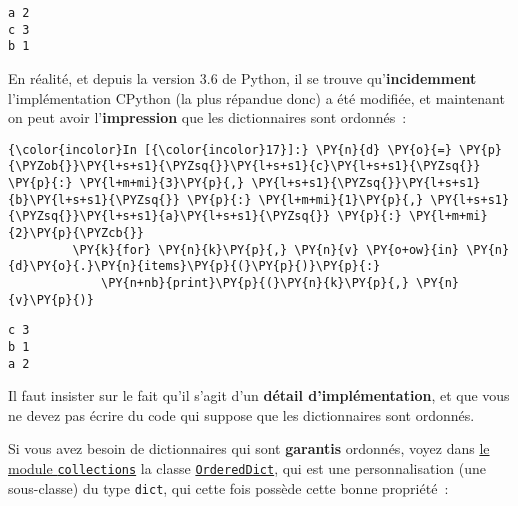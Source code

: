     \begin{Verbatim}[commandchars=\\\{\},frame=single,framerule=0.3mm,rulecolor=\color{cellframecolor}]
a 2
c 3
b 1
\end{Verbatim}

    En réalité, et depuis la version 3.6 de Python, il se trouve
qu'\textbf{incidemment} l'implémentation CPython (la plus répandue donc)
a été modifiée, et maintenant on peut avoir l'\textbf{impression} que
les dictionnaires sont ordonnés~:

    \begin{Verbatim}[commandchars=\\\{\},frame=single,framerule=0.3mm,rulecolor=\color{cellframecolor}]
{\color{incolor}In [{\color{incolor}17}]:} \PY{n}{d} \PY{o}{=} \PY{p}{\PYZob{}}\PY{l+s+s1}{\PYZsq{}}\PY{l+s+s1}{c}\PY{l+s+s1}{\PYZsq{}} \PY{p}{:} \PY{l+m+mi}{3}\PY{p}{,} \PY{l+s+s1}{\PYZsq{}}\PY{l+s+s1}{b}\PY{l+s+s1}{\PYZsq{}} \PY{p}{:} \PY{l+m+mi}{1}\PY{p}{,} \PY{l+s+s1}{\PYZsq{}}\PY{l+s+s1}{a}\PY{l+s+s1}{\PYZsq{}} \PY{p}{:} \PY{l+m+mi}{2}\PY{p}{\PYZcb{}}
         \PY{k}{for} \PY{n}{k}\PY{p}{,} \PY{n}{v} \PY{o+ow}{in} \PY{n}{d}\PY{o}{.}\PY{n}{items}\PY{p}{(}\PY{p}{)}\PY{p}{:}
             \PY{n+nb}{print}\PY{p}{(}\PY{n}{k}\PY{p}{,} \PY{n}{v}\PY{p}{)}
\end{Verbatim}


    \begin{Verbatim}[commandchars=\\\{\},frame=single,framerule=0.3mm,rulecolor=\color{cellframecolor}]
c 3
b 1
a 2
\end{Verbatim}

    Il faut insister sur le fait qu'il s'agit d'un \textbf{détail
d'implémentation}, et que vous ne devez pas écrire du code qui suppose
que les dictionnaires sont ordonnés.

    Si vous avez besoin de dictionnaires qui sont \textbf{garantis}
ordonnés, voyez dans
\href{https://docs.python.org/3/library/collections.html}{le module
\texttt{collections}} la classe
\href{https://docs.python.org/3/library/collections.html\#collections.OrderedDict}{\texttt{OrderedDict}},
qui est une personnalisation (une sous-classe) du type \texttt{dict},
qui cette fois possède cette bonne propriété~:

